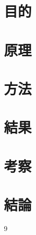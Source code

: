 \documentclass[11pt,dvipdfmx]{jarticle}
\begin{document}
\begin{jikkenTitle}
	\subTitle{} %
\end{jikkenTitle}

\section{目的}
\section{原理}
\section{方法}
\section{結果}
\section{考察}
\section{結論}

\begin{thebibliography}{9}%
\end{thebibliography}
\end{document}
